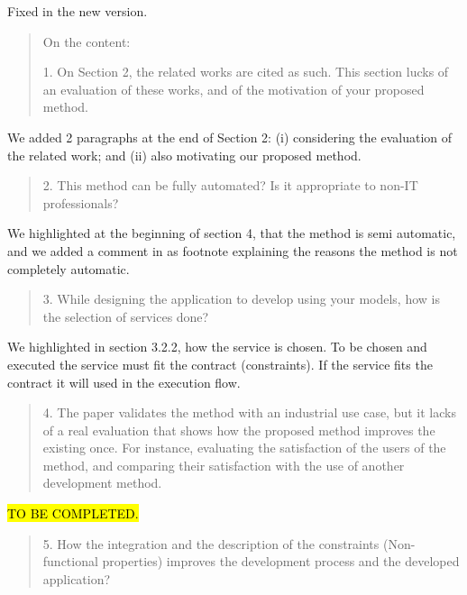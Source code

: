 \documentclass[12pt,a4wide]{article}
\begin{document}
\noindent 
Fixed in the new version.


\begin{quotation}\sf\footnotesize

\noindent On the content: 

1.	On Section 2, the related works are cited as such. This section lucks of an evaluation of these works, and of the motivation of your proposed method. 
\end{quotation}

\noindent 
We added 2 paragraphs at the end of Section 2: (i) considering the evaluation of the related work; and (ii) also motivating our proposed method. 
\begin{quotation}\sf\footnotesize

2.	This method can be fully automated? Is it appropriate to non-IT professionals? 
\end{quotation}

\noindent 
We highlighted at the beginning of section 4, that the method is semi automatic, and we added a comment in as footnote explaining the reasons the method is not completely automatic.

\begin{quotation}\sf\footnotesize

3.	While designing the application to develop using your models, how is the selection of services done? 
\end{quotation}

\noindent 
We highlighted in section 3.2.2, how the service is chosen.  To be chosen and executed the service must fit the contract (constraints). If the service fits the contract it will used in the execution flow.

\begin{quotation}\sf\footnotesize

4.	The paper validates the method with an industrial use case, but it lacks of a real evaluation that shows how the proposed method improves the existing once. For instance, evaluating the satisfaction of the users of the method, and comparing their satisfaction with the use of another development method. 
\end{quotation}

\noindent 
\hl{TO BE COMPLETED.}

\begin{quotation}\sf\footnotesize

5.	How the integration and the description of the constraints (Non-functional properties) improves the development process and the developed application? 
\end{quotation}
\end{document}
